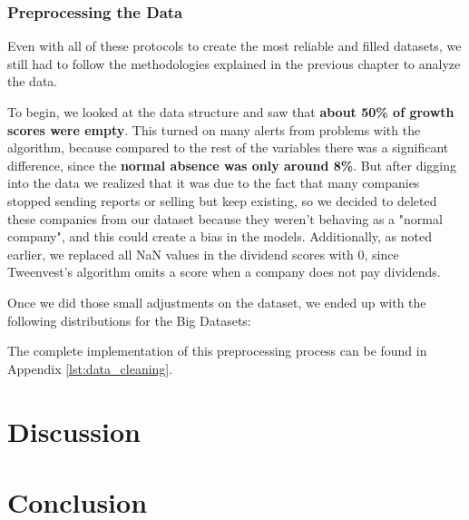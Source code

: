 \documentclass[11pt,english,a4paper,hidelinks]{book}
\begin{document}
\subsection{Preprocessing the Data}

Even with all of these protocols to create the most reliable and filled datasets, we still had to follow the methodologies explained in the previous chapter to analyze the data.

\vspace{0.5cm}
\noindent To begin, we looked at the data structure and saw that \textbf{about 50\% of growth scores were empty}. This turned on many alerts from problems with the algorithm, because compared to the rest of the variables there was a significant difference, since the \textbf{normal absence was only around 8\%}. But after digging into the data we realized that it was due to the fact that many companies stopped sending reports or selling but keep existing, so we decided to deleted these companies from our dataset because they weren't behaving as a "normal company", and this could create a bias in the models. Additionally, as noted earlier, we replaced all NaN values in the dividend scores with 0, since Tweenvest's algorithm omits a score when a company does not pay dividends.

\vspace{0.5cm}
\noindent Once we did those small adjustments on the dataset, we ended up with the following distributions for the Big Datasets:



\vspace{0.5cm}
\noindent The complete implementation of this preprocessing process can be found in Appendix \ref{lst:data_cleaning}.

\chapter{Discussion}

\chapter{Conclusion}

\printbibliography[heading=bibintoc, title=Bibliography]
\label{sec:biblio}
\newpage
\end{document}
